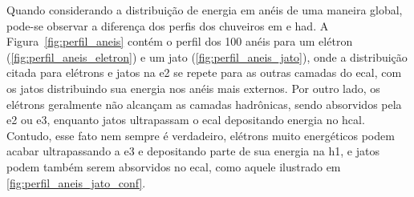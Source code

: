 Quando considerando a distribuição de energia em anéis de uma maneira global,
pode-se observar a diferença dos perfis dos chuveiros \gls{em} e
\gls{had}. A Figura~\ref{fig:perfil_aneis} contém o perfil dos 100 anéis para um
elétron (\ref{fig:perfil_aneis_eletron}) e um jato
(\ref{fig:perfil_aneis_jato}), onde a distribuição citada para elétrons e jatos
na \gls{e2} se repete para as outras camadas do \gls{ecal}, com os jatos
distribuindo sua energia nos anéis mais externos. Por outro lado, os elétrons
geralmente não alcançam as camadas hadrônicas, sendo absorvidos pela
\gls{e2} ou \gls{e3}, enquanto jatos ultrapassam o \gls{ecal} depositando
energia no \gls{hcal}. Contudo, esse fato nem sempre é verdadeiro, elétrons
muito energéticos podem acabar ultrapassando a \gls{e3} e depositando parte de
sua energia na \gls{h1}, e jatos podem também serem absorvidos no \gls{ecal},
como aquele ilustrado em \ref{fig:perfil_aneis_jato_conf}.

